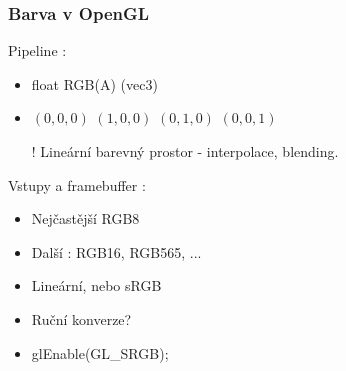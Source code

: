 \begin{frame}
    \frametitle{Barva v OpenGL}

    Pipeline :
    \begin{itemize}
        \item float RGB(A) (vec3)
        \item {\color{black}$(0,0,0)$ \color{red}$(1,0,0)$ \color{green}$(0,1,0)$ \color{blue}$(0,0,1)$}
        \item[\color{red}!] Lineární barevný prostor - interpolace, blending.
    \end{itemize}
    \pause\vfill
    Vstupy a framebuffer :
    \begin{itemize}
        \item Nejčastější RGB8
        \item Další : RGB16, RGB565, ...
        \item Lineární, nebo sRGB
        \item Ruční konverze?
        \item glEnable(GL\_SRGB);
    \end{itemize}
\end{frame}

